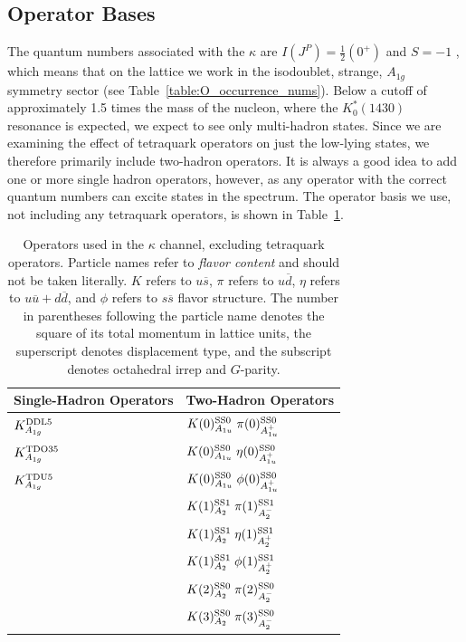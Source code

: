 \subsection{Operator Bases}
The quantum numbers associated with the $\kappa$ are $I(J^{P})=\frac{1}{2}(0^+)$ and $S=-1$ , which means that on the lattice we work in the isodoublet, strange, $A_{1g}$ symmetry sector (see Table~\ref{table:O_occurrence_nums}). Below a cutoff of approximately 1.5 times the mass of the nucleon, where the $K_0^*(1430)$ resonance is expected, we expect to see only multi-hadron states. Since we are examining the effect of tetraquark operators on just the low-lying states, we therefore primarily include two-hadron operators. It is always a good idea to add one or more single hadron operators, however, as any operator with the correct quantum numbers can excite states in the spectrum. The operator basis we use, not including any tetraquark operators, is shown in Table~\ref{table:kappa_ops_no_tq}.
\begin{table}
  \centering
  \begin{tabular}{l|l}
    \textbf{Single-Hadron Operators} & \textbf{Two-Hadron Operators}\\
    \hline
    $K^{\rm{DDL}5}_{A_{1g}}$ & $K(0)^{\rm{SS}0}_{A_{1u}}\; \pi(0)^{\rm{SS}0}_{A_{1u}^+}$\\
    $K^{\rm{TDO3}5}_{A_{1g}}$ & $K(0)^{\rm{SS}0}_{A_{1u}}\; \eta(0)^{\rm{SS}0}_{A_{1u}^+}$ \\
    $K^{\rm{TDU}5}_{A_{1g}}$ & $K(0)^{\rm{SS}0}_{A_{1u}}\; \phi(0)^{\rm{SS}0}_{A_{1u}^+}$ \\
    & $K(1)^{\rm{SS}1}_{A_2}\; \pi(1)^{\rm{SS}1}_{A_2^-}$ \\
    & $K(1)^{\rm{SS}1}_{A_2}\; \eta(1)^{\rm{SS}1}_{A_2^+}$ \\
    & $K(1)^{\rm{SS}1}_{A_2}\; \phi(1)^{\rm{SS}1}_{A_2^+}$ \\
    & $K(2)^{\rm{SS}0}_{A_2}\; \pi(2)^{\rm{SS}0}_{A_2^-}$ \\
    & $K(3)^{\rm{SS}0}_{A_2}\; \pi(3)^{\rm{SS}0}_{A_2^-}$
  \end{tabular}
  \caption[Operators used in the $\kappa$ channel, excluding tetraquark operators.]{Operators used in the $\kappa$ channel, excluding tetraquark operators. Particle names refer to \emph{flavor content} and should not be taken literally. $K$ refers to $u\overline s$, $\pi$ refers to $u\overline d$, $\eta$ refers to $u\overline u + d\overline d$, and $\phi$ refers to $s\overline s$ flavor structure. The number in parentheses following the particle name denotes the square of its total momentum in lattice units, the superscript denotes displacement type, and the subscript denotes octahedral irrep and $G$-parity.}
  \label{table:kappa_ops_no_tq}
\end{table}

